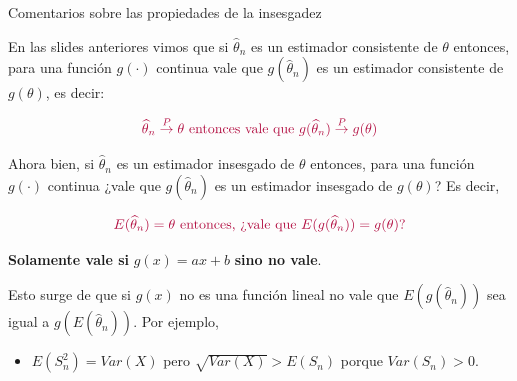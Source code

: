 \documentclass{beamer}
\theoremstyle{definition}
\newcommand{\cp}{\overset{P}{\rightarrow}}
\begin{document}
\begin{frame}{\color{rosee}Comentarios sobre las propiedades de la insesgadez}
\small 

En las slides anteriores vimos que si $\widehat{\theta}_n$ es un estimador consistente de $\theta$ entonces, para una función $g(\cdot)$ continua vale que $g(\widehat{\theta}_n)$ es un estimador consistente de $g(\theta)$, es decir:

\[\color{rosee}\widehat{\theta}_n \cp \theta \text{ entonces vale que } g(\widehat{\theta}_n)\cp g(\theta)\]

Ahora bien, si $\widehat{\theta}_n$ es un estimador insesgado de $\theta$ entonces, para una función $g(\cdot)$ continua ¿vale que $g(\widehat{\theta}_n)$ es un estimador insesgado de $g(\theta)$? Es decir,

\[\color{rosee}E(\widehat{\theta}_n)=\theta \text { entonces, ¿vale que } E(g(\widehat{\theta}_n))= g(\theta)\text{?}\]

\textbf{Solamente vale si} $g(x)=ax+b$ \textbf{sino no vale}. 

Esto surge de que si $g(x)$ no es una función lineal no vale que $E(g(\widehat{\theta}_n))$ sea igual a $g(E(\widehat{\theta}_n))$. Por ejemplo,

\begin{itemize}
    \item $E(S_n^2)=Var(X)$ pero $\sqrt{Var(X)}>E(S_n)$ porque $Var(S_n)>0$.
    \end{itemize}
\end{frame}
\end{document}
